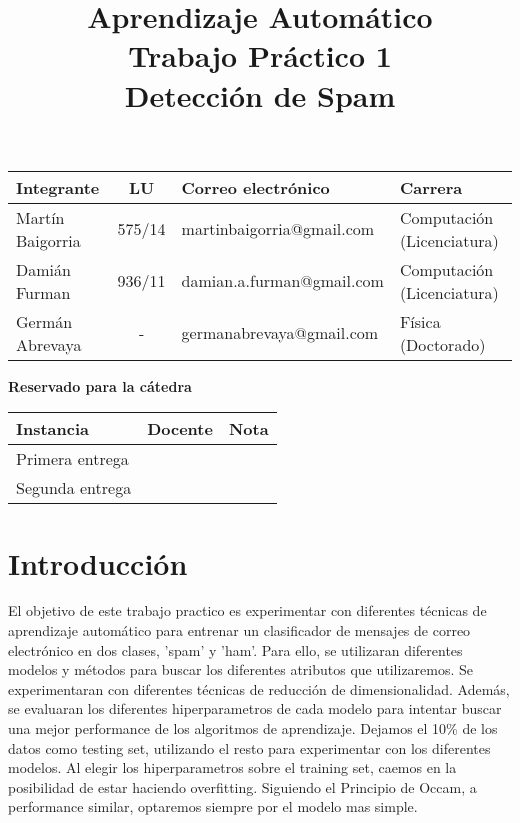 \documentclass[10pt,a4paper]{article}
\title{Aprendizaje Automático \\ Trabajo Práctico 1 \\ Detección de Spam }
\begin{document}

\maketitle

\bigskip

\begin{table}[h]
\centering
\begin{tabular}{|l l l l|}
\hline
Integrante       & \multicolumn{1}{c}{LU}     & Correo electrónico       	& Carrera \\ \hline
Martín Baigorria & \multicolumn{1}{c}{575/14} & martinbaigorria@gmail.com & Computación (Licenciatura) \\ 
Damián Furman & \multicolumn{1}{c}{936/11}& damian.a.furman@gmail.com & Computación (Licenciatura)\\
Germán Abrevaya & \multicolumn{1}{c}{-} & germanabrevaya@gmail.com & Física (Doctorado)\\ \hline
\end{tabular}
\end{table}

\vfill

\begin{center}
\textbf{Reservado para la cátedra}
\end{center}
\begin{table}[h]
\centering
\begin{tabular}{|l|l|l|}
\hline
Instancia       & Docente & Nota \\ \hline
Primera entrega &         &      \\ \hline
Segunda entrega &         &      \\ \hline
\end{tabular}
\end{table}

\newpage
\tableofcontents
\newpage


\section{Introducción}

El objetivo de este trabajo practico es experimentar con diferentes técnicas de aprendizaje automático para entrenar un clasificador de mensajes de correo electrónico en dos clases, 'spam' y 'ham'. Para ello, se utilizaran diferentes modelos y métodos para buscar los diferentes atributos que utilizaremos. Se experimentaran con diferentes técnicas de reducción de dimensionalidad. Además, se evaluaran los diferentes hiperparametros de cada modelo para intentar buscar una mejor performance de los algoritmos de aprendizaje. Dejamos el 10\% de los datos como testing set, utilizando el resto para experimentar con los diferentes modelos. Al elegir los hiperparametros sobre el training set, caemos en la posibilidad de estar haciendo overfitting. Siguiendo el Principio de Occam, a performance similar, optaremos siempre por el modelo mas simple.
\end{document}
